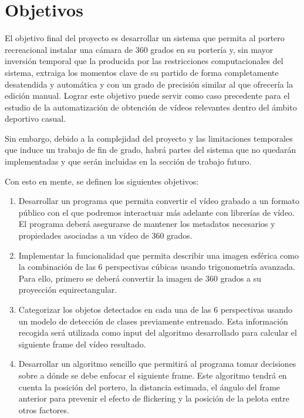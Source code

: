 \section[Objetivos]{Objetivos}
El objetivo final del proyecto es desarrollar un sistema que permita al portero recreacional instalar una cámara de 360 grados en su portería y, sin mayor inversión temporal que la producida por las restricciones computacionales del sistema, extraiga los momentos clave de su partido de forma completamente desatendida y automática y con un grado de precisión similar al que ofrecería la edición manual. Lograr este objetivo puede servir como caso precedente para el estudio de la automatización de obtención de vídeos relevantes dentro del ámbito deportivo casual.

Sin embargo, debido a la complejidad del proyecto y las limitaciones temporales que induce un trabajo de fin de grado, habrá partes del sistema que no quedarán implementadas y que serán incluidas en la sección de trabajo futuro.

Con esto en mente, se definen los siguientes objetivos:

\begin{enumerate}
	\item Desarrollar un programa que permita convertir el vídeo grabado a un formato público con el que podremos interactuar más adelante con librerías de vídeo. El programa deberá asegurarse de mantener los metadatos necesarios y propiedades asociadas a un vídeo de 360 grados.

	\item Implementar la funcionalidad que permita describir una imagen esférica como la combinación de las 6 perspectivas cúbicas usando trigonometría avanzada. Para ello, primero se deberá convertir la imagen de 360 grados a su proyección equirectangular.
	
	\item Categorizar los objetos detectados en cada una de las 6 perspectivas usando un modelo de detección de clases previamente entrenado. Esta información recogida será utilizada como input del algoritmo desarrollado para calcular el siguiente frame del vídeo resultado.
	
	\item Desarrollar un algoritmo sencillo que permitirá al programa tomar decisiones sobre a dónde se debe enfocar el siguiente frame. Este algoritmo tendrá en cuenta la posición del portero, la distancia estimada, el ángulo del frame anterior para prevenir el efecto de flickering y la posición de la pelota entre otros factores.
	  
\end{enumerate}

